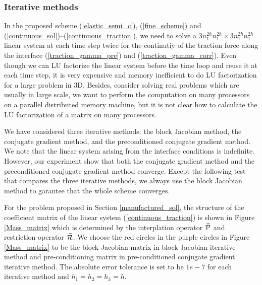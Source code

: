 \subsubsection{Iterative methods}\label{iterative_section}
In the proposed scheme (\ref{elastic_semi_c}), (\ref{fine_scheme}) and (\ref{continuous_sol})--(\ref{continuous_traction}), we need to solve a $3n_1^{2h}n_1^{2h}\times 3n_1^{2h}n_1^{2h}$ linear system at each time step twice for the continutiy of the traction force along the interface (\ref{traction_gamma_pre}) and (\ref{traction_gamma_corr}). Even though we can LU factorize the linear system before the time loop and reuse it at each time step, it is very expensive and memory inefficient to do LU factorization for a large problem in $3$D. Besides, consider solving real problems which are usually in large scale, we want to perform the computation on many processors on a parallel distributed memory machine, but it is not clear how to calculate the LU factorization of a matrix on many processors. 

We have considered three iterative methods: the block Jacobian method, the conjugate gradient method, and the preconditioned conjugate gradient method. We note that the linear system arising from the interface conditions is indefinite. However, our experiment show that both the conjugate gradient method and the preconditioned conjugate gradient method converge. Except the following test that compares the three iterative methods, we always use the block Jacobian method to garantee that the whole scheme converges. 

For the problem proposed in Section \ref{manufactured_sol}, the structure of the coefficient matrix of the linear system (\ref{continuous_traction}) is shown in Figure \ref{Mass_matrix} which is determined by the interplation operator $\widetilde{\mathcal{P}}$ and restriction operator $\widetilde{\mathcal{R}}$. We choose the red circles in the purple circles in Figure \ref{Mass_matrix} to be the block Jacobian matrix in block Jacobian iterative method and pre-conditioning matrix in pre-conditioned conjugate gradient iterative method. The absolute error tolerance is set to be $1e-7$ for each iterative method and $h_1 = h_2 = h_3 = h$.

